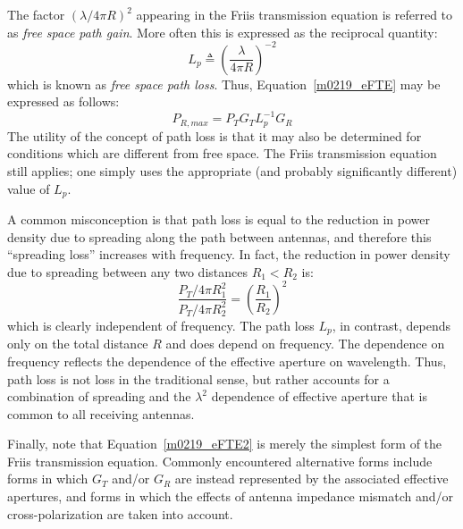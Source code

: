 The factor $\left(\lambda/4\pi R\right)^2$
%
appearing in the Friis transmission equation is referred to as \emph{free space path gain}.
More often this is expressed as the reciprocal quantity:
%
\begin{equation}
\boxed{
L_p \triangleq \left(\frac{\lambda}{4\pi R}\right)^{-2} 
}
\end{equation}
%
which is known as \emph{free space path loss}.
Thus, Equation~\ref{m0219_eFTE} may be expressed as follows:
%
\begin{equation}
P_{R,max} = P_T G_T L_p^{-1} G_R
\label{m0219_eFTE2}
\end{equation}
%
The utility of the concept of path loss is that it may also be determined for conditions which are different from free space.
The Friis transmission equation still applies; one simply uses the appropriate (and probably significantly different) value of $L_p$.

A common misconception is that path loss is equal to the reduction in power density due to spreading along the path between antennas, and therefore this ``spreading loss'' increases with frequency.
In fact, the reduction in power density due to spreading between any two distances $R_1 < R_2$ is:
%
\begin{equation}
\frac{P_T/4\pi R_1^2}{P_T/4\pi R_2^2} = \left(\frac{R_1}{R_2}\right)^2
\end{equation}
%
which is clearly independent of frequency.
The path loss $L_p$, in contrast, depends only on the total distance $R$ and does depend on frequency.
The dependence on frequency reflects the dependence of the effective aperture on wavelength.
Thus, path loss is not loss in the traditional sense, but rather accounts for a combination of spreading and the $\lambda^2$ dependence of effective aperture that is common to all receiving antennas. 

Finally, note that Equation~\ref{m0219_eFTE2} is merely the simplest form of the Friis transmission equation.
Commonly encountered alternative forms include forms in which $G_T$ and/or $G_R$ are instead represented by the associated effective apertures, and forms in which the effects of antenna impedance mismatch and/or cross-polarization are taken into account.

